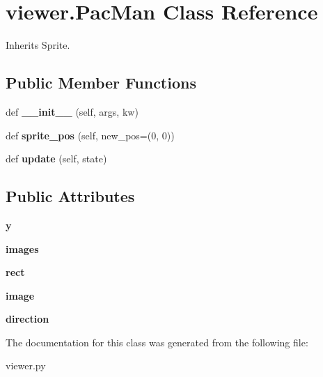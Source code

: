 \hypertarget{classviewer_1_1_pac_man}{}\section{viewer.\+Pac\+Man Class Reference}
\label{classviewer_1_1_pac_man}


Inherits Sprite.

\subsection*{Public Member Functions}
\begin{DoxyCompactItemize}
\item 
\mbox{\label{classviewer_1_1_pac_man_a91fefcf2f93f37a81e6ab4471e390928}} 
def {\bfseries \+\_\+\+\_\+init\+\_\+\+\_\+} (self, args, kw)
\item 
\mbox{\label{classviewer_1_1_pac_man_a9e7f27110668ab1680b2cb9387ecdc11}} 
def {\bfseries sprite\+\_\+pos} (self, new\+\_\+pos=(0, 0))
\item 
\mbox{\label{classviewer_1_1_pac_man_a62e3cac5f7c1bc9d1695f7185188df11}} 
def {\bfseries update} (self, state)
\end{DoxyCompactItemize}
\subsection*{Public Attributes}
\begin{DoxyCompactItemize}
\item 
\mbox{\label{classviewer_1_1_pac_man_ab02dc91951d0922b14921ecb906b687e}} 
{\bfseries y}
\item 
\mbox{\label{classviewer_1_1_pac_man_a2d722d4d54477d8b7cbebd3db6fadc55}} 
{\bfseries images}
\item 
\mbox{\label{classviewer_1_1_pac_man_a4db9216902ef5e003d57dc12a320ada3}} 
{\bfseries rect}
\item 
\mbox{\label{classviewer_1_1_pac_man_acfafaa5352bbbf9b56f5bb458aa729b2}} 
{\bfseries image}
\item 
\mbox{\label{classviewer_1_1_pac_man_ae706581b89426de7d68d876f2ba49c78}} 
{\bfseries direction}
\end{DoxyCompactItemize}


The documentation for this class was generated from the following file\+:\begin{DoxyCompactItemize}
\item 
viewer.\+py\end{DoxyCompactItemize}
